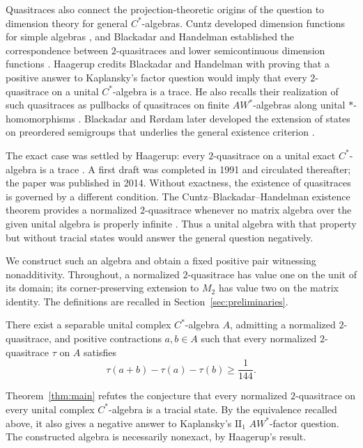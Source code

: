 Quasitraces also connect the projection-theoretic origins of the question
to dimension theory for general \(C^*\)-algebras. Cuntz developed
dimension functions for simple algebras \cite{Cuntz1978}, and
Blackadar and Handelman established the correspondence between
\(2\)-quasitraces and lower semicontinuous dimension functions
\cite{BH}. Haagerup credits Blackadar and Handelman with proving that
a positive answer to Kaplansky's factor question would imply that every
\(2\)-quasitrace on a unital \(C^*\)-algebra is a trace. He also recalls
their realization of such quasitraces as pullbacks of quasitraces on
finite \(AW^*\)-algebras along unital \(*\)-homomorphisms
\cite[Introduction and Proposition~3.3]{Haagerup}.
Blackadar and R{\o}rdam later developed the extension of states on
preordered semigroups that underlies the general existence criterion
\cite{BR}.

The exact case was settled by Haagerup: every \(2\)-quasitrace on a
unital exact \(C^*\)-algebra is a trace \cite[Theorem~5.11]{Haagerup}.
A first draft was completed in 1991 and circulated thereafter; the
paper was published in 2014. Without
exactness, the existence of quasitraces is governed by a different
condition. The Cuntz--Blackadar--Handelman existence theorem provides a
normalized \(2\)-quasitrace whenever no matrix algebra over the given
unital algebra is properly infinite \cite[Theorem~2.3]{MR}.
Thus a unital algebra with that property but without tracial states
would answer the general question negatively.

We construct such an algebra and obtain a fixed positive pair
witnessing nonadditivity. Throughout, a normalized \(2\)-quasitrace
has value one on the unit of its domain; its corner-preserving
extension to \(M_2\) has value two on the matrix identity.
The definitions are recalled in Section~\ref{sec:preliminaries}.

\begin{theorem}
\label{thm:main}
There exist a separable unital complex \(C^*\)-algebra \(A\), admitting
a normalized \(2\)-quasitrace, and positive contractions \(a,b\in A\)
such that every normalized \(2\)-quasitrace \(\tau\) on \(A\) satisfies
\[
 \tau(a+b)-\tau(a)-\tau(b)\ge\frac1{144}.
\]
\end{theorem}

Theorem~\ref{thm:main} refutes the conjecture that every normalized
\(2\)-quasitrace on every unital complex \(C^*\)-algebra is a tracial
state. By the equivalence recalled above, it also gives a negative
answer to Kaplansky's \(\mathrm{II}_1\) \(AW^*\)-factor question.
The constructed algebra is necessarily nonexact, by Haagerup's
result.

